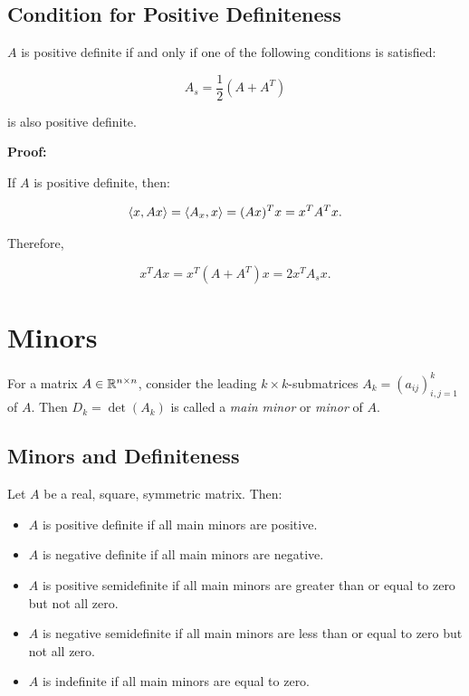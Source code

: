 \subsection{Condition for Positive Definiteness}

\(A\) is positive definite if and only if one of the following conditions is satisfied:

\[
    A_s = \frac{1}{2} \left(A + A^T\right)
\]

is also positive definite. 

\textbf{Proof:}

If \(A\) is positive definite, then: 

\[
    \left\langle x, Ax\right\rangle = \left\langle A_x, x\right\rangle = (Ax)^Tx = x^T A^T x.
\]

Therefore, 

\[
    x^T Ax = x^T (A + A^T)x = 2x^TA_s x.
\]

\QED

\section{Minors}

For a matrix \(A \in \mathbb{R}^{n \times n}\), consider the leading \(k \times k\)-submatrices 
\(A_k = (a_{ij})_{i,j=1}^{k}\) of \(A\). Then \(D_k  = \det(A_k)\) is called a \emph{main minor} or 
\emph{minor} of \(A\).

\subsection{Minors and Definiteness}

Let \(A\) be a real, square, symmetric matrix. Then:

\begin{itemize}
    
    \item \(A\) is positive definite if all main minors are positive.

    \item \(A\) is negative definite if all main minors are negative.

    \item \(A\) is positive semidefinite if all main minors are greater than or equal to zero but not all zero. 

    \item \(A\) is negative semidefinite if all main minors are less than or equal to zero but not all zero.

    \item \(A\) is indefinite if all main minors are equal to zero.

\end{itemize}

